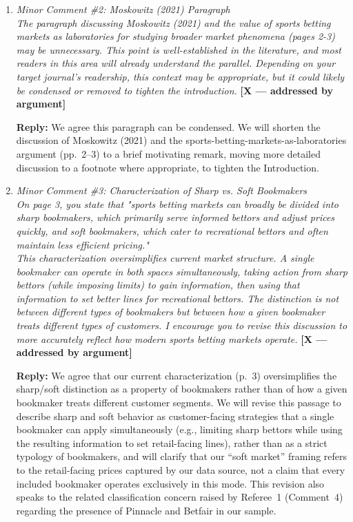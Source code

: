 \documentclass[letterpaper,12pt]{article}
\newcounter{b}
\newcommand{\argX}{\textcolor{green!55!black}{\textbf{[X --- addressed by argument]}}}
\newcommand{\Reply}[1]{\par\noindent\textbf{Reply:} #1}
\begin{document}
\begin{enumerate}
\Reply{We agree and will restructure the Introduction to lead with a concise statement of our research question, empirical setting, and main findings, before turning to the detailed literature review, following the referee's suggestion.}

\item \textit{Minor Comment \#2: Moskowitz (2021) Paragraph\\[6pt]
The paragraph discussing Moskowitz (2021) and the value of sports betting markets as laboratories for studying broader market phenomena (pages 2-3) may be unnecessary. This point is well-established in the literature, and most readers in this area will already understand the parallel. Depending on your target journal's readership, this context may be appropriate, but it could likely be condensed or removed to tighten the introduction.} \argX

\Reply{We agree this paragraph can be condensed. We will shorten the discussion of Moskowitz (2021) and the sports-betting-markets-as-laboratories argument (pp.~2--3) to a brief motivating remark, moving more detailed discussion to a footnote where appropriate, to tighten the Introduction.}

\item \textit{Minor Comment \#3: Characterization of Sharp vs. Soft Bookmakers\\[6pt]
On page 3, you state that "sports betting markets can broadly be divided into sharp bookmakers, which primarily serve informed bettors and adjust prices quickly, and soft bookmakers, which cater to recreational bettors and often maintain less efficient pricing."\\[6pt]
This characterization oversimplifies current market structure. A single bookmaker can operate in both spaces simultaneously, taking action from sharp bettors (while imposing limits) to gain information, then using that information to set better lines for recreational bettors. The distinction is not between different types of bookmakers but between how a given bookmaker treats different types of customers. I encourage you to revise this discussion to more accurately reflect how modern sports betting markets operate.} \argX

\Reply{We agree that our current characterization (p.~3) oversimplifies the sharp/soft distinction as a property of bookmakers rather than of how a given bookmaker treats different customer segments. We will revise this passage to describe sharp and soft behavior as customer-facing strategies that a single bookmaker can apply simultaneously (e.g., limiting sharp bettors while using the resulting information to set retail-facing lines), rather than as a strict typology of bookmakers, and will clarify that our ``soft market'' framing refers to the retail-facing prices captured by our data source, not a claim that every included bookmaker operates exclusively in this mode. This revision also speaks to the related classification concern raised by Referee~1 (Comment~4) regarding the presence of Pinnacle and Betfair in our sample.}


\end{enumerate}
\end{document}
